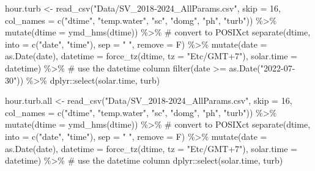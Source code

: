 \documentclass[
  letterpaper,
  DIV=11,
  numbers=noendperiod]{scrartcl}
\newenvironment{Shaded}{\begin{snugshade}}{\end{snugshade}}
\newcommand{\AttributeTok}[1]{\textcolor[rgb]{0.40,0.45,0.13}{#1}}
\newcommand{\CommentTok}[1]{\textcolor[rgb]{0.37,0.37,0.37}{#1}}
\newcommand{\DecValTok}[1]{\textcolor[rgb]{0.68,0.00,0.00}{#1}}
\newcommand{\FunctionTok}[1]{\textcolor[rgb]{0.28,0.35,0.67}{#1}}
\newcommand{\NormalTok}[1]{\textcolor[rgb]{0.00,0.23,0.31}{#1}}
\newcommand{\OtherTok}[1]{\textcolor[rgb]{0.00,0.23,0.31}{#1}}
\newcommand{\SpecialCharTok}[1]{\textcolor[rgb]{0.37,0.37,0.37}{#1}}
\newcommand{\StringTok}[1]{\textcolor[rgb]{0.13,0.47,0.30}{#1}}
\begin{document}
\begin{Shaded}
\begin{Highlighting}[]
\NormalTok{hour.turb }\OtherTok{\textless{}{-}} \FunctionTok{read\_csv}\NormalTok{(}\StringTok{"Data/SV\_2018{-}2024\_AllParams.csv"}\NormalTok{, }
                      \AttributeTok{skip =} \DecValTok{16}\NormalTok{, }
                      \AttributeTok{col\_names =} \FunctionTok{c}\NormalTok{(}\StringTok{"dtime"}\NormalTok{, }\StringTok{"temp.water"}\NormalTok{, }\StringTok{"sc"}\NormalTok{, }\StringTok{"domg"}\NormalTok{, }\StringTok{"ph"}\NormalTok{, }\StringTok{"turb"}\NormalTok{)) }\SpecialCharTok{\%\textgreater{}\%}
  \FunctionTok{mutate}\NormalTok{(}\AttributeTok{dtime =} \FunctionTok{ymd\_hms}\NormalTok{(dtime)) }\SpecialCharTok{\%\textgreater{}\%}                 \CommentTok{\# convert to POSIXct}
  \FunctionTok{separate}\NormalTok{(dtime, }\AttributeTok{into =} \FunctionTok{c}\NormalTok{(}\StringTok{"date"}\NormalTok{, }\StringTok{"time"}\NormalTok{), }\AttributeTok{sep =} \StringTok{" "}\NormalTok{, }\AttributeTok{remove =}\NormalTok{ F) }\SpecialCharTok{\%\textgreater{}\%}
  \FunctionTok{mutate}\NormalTok{(}\AttributeTok{date =} \FunctionTok{as.Date}\NormalTok{(date),}
        \AttributeTok{datetime =} \FunctionTok{force\_tz}\NormalTok{(dtime, }\AttributeTok{tz =} \StringTok{"Etc/GMT+7"}\NormalTok{),}
         \AttributeTok{solar.time =}\NormalTok{ datetime) }\SpecialCharTok{\%\textgreater{}\%}                  \CommentTok{\# use the datetime column}
  \FunctionTok{filter}\NormalTok{(date }\SpecialCharTok{\textgreater{}=} \FunctionTok{as.Date}\NormalTok{(}\StringTok{"2022{-}07{-}30"}\NormalTok{)) }\SpecialCharTok{\%\textgreater{}\%}
\NormalTok{  dplyr}\SpecialCharTok{::}\FunctionTok{select}\NormalTok{(solar.time, turb)}


\NormalTok{hour.turb.all }\OtherTok{\textless{}{-}} \FunctionTok{read\_csv}\NormalTok{(}\StringTok{"Data/SV\_2018{-}2024\_AllParams.csv"}\NormalTok{, }
                      \AttributeTok{skip =} \DecValTok{16}\NormalTok{, }
                      \AttributeTok{col\_names =} \FunctionTok{c}\NormalTok{(}\StringTok{"dtime"}\NormalTok{, }\StringTok{"temp.water"}\NormalTok{, }\StringTok{"sc"}\NormalTok{, }\StringTok{"domg"}\NormalTok{, }\StringTok{"ph"}\NormalTok{, }\StringTok{"turb"}\NormalTok{)) }\SpecialCharTok{\%\textgreater{}\%}
  \FunctionTok{mutate}\NormalTok{(}\AttributeTok{dtime =} \FunctionTok{ymd\_hms}\NormalTok{(dtime)) }\SpecialCharTok{\%\textgreater{}\%}                 \CommentTok{\# convert to POSIXct}
  \FunctionTok{separate}\NormalTok{(dtime, }\AttributeTok{into =} \FunctionTok{c}\NormalTok{(}\StringTok{"date"}\NormalTok{, }\StringTok{"time"}\NormalTok{), }\AttributeTok{sep =} \StringTok{" "}\NormalTok{, }\AttributeTok{remove =}\NormalTok{ F) }\SpecialCharTok{\%\textgreater{}\%}
  \FunctionTok{mutate}\NormalTok{(}\AttributeTok{date =} \FunctionTok{as.Date}\NormalTok{(date),}
        \AttributeTok{datetime =} \FunctionTok{force\_tz}\NormalTok{(dtime, }\AttributeTok{tz =} \StringTok{"Etc/GMT+7"}\NormalTok{),}
         \AttributeTok{solar.time =}\NormalTok{ datetime) }\SpecialCharTok{\%\textgreater{}\%}                  \CommentTok{\# use the datetime column}
\NormalTok{  dplyr}\SpecialCharTok{::}\FunctionTok{select}\NormalTok{(solar.time, turb)}
\end{Highlighting}
\end{Shaded}
\end{document}
